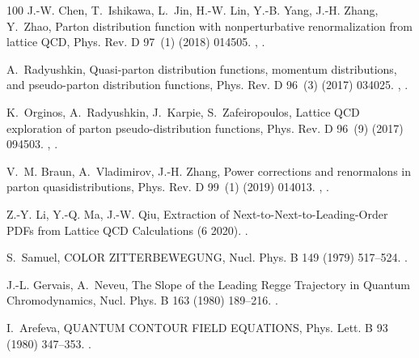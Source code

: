 \begin{thebibliography}{100}
J.-W. Chen, T.~Ishikawa, L.~Jin, H.-W. Lin, Y.-B. Yang, J.-H. Zhang, Y.~Zhao,
  {Parton distribution function with nonperturbative renormalization from
  lattice QCD}, Phys. Rev. D 97~(1) (2018) 014505.
\newblock \href {http://arxiv.org/abs/1706.01295} {},
  \href {https://doi.org/10.1103/PhysRevD.97.014505}
  {}.

A.~Radyushkin, {Quasi-parton distribution functions, momentum distributions,
  and pseudo-parton distribution functions}, Phys. Rev. D 96~(3) (2017) 034025.
\newblock \href {http://arxiv.org/abs/1705.01488} {},
  \href {https://doi.org/10.1103/PhysRevD.96.034025}
  {}.

K.~Orginos, A.~Radyushkin, J.~Karpie, S.~Zafeiropoulos, {Lattice QCD
  exploration of parton pseudo-distribution functions}, Phys. Rev. D 96~(9)
  (2017) 094503.
\newblock \href {http://arxiv.org/abs/1706.05373} {},
  \href {https://doi.org/10.1103/PhysRevD.96.094503}
  {}.

V.~M. Braun, A.~Vladimirov, J.-H. Zhang, {Power corrections and renormalons in
  parton quasidistributions}, Phys. Rev. D 99~(1) (2019) 014013.
\newblock \href {http://arxiv.org/abs/1810.00048} {},
  \href {https://doi.org/10.1103/PhysRevD.99.014013}
  {}.

Z.-Y. Li, Y.-Q. Ma, J.-W. Qiu, {Extraction of Next-to-Next-to-Leading-Order
  PDFs from Lattice QCD Calculations} (6 2020).
\newblock \href {http://arxiv.org/abs/2006.12370} {}.

S.~Samuel, {COLOR ZITTERBEWEGUNG}, Nucl. Phys. B 149 (1979) 517--524.
\newblock \href {https://doi.org/10.1016/0550-3213(79)90005-1}
  {}.

J.-L. Gervais, A.~Neveu, {The Slope of the Leading Regge Trajectory in Quantum
  Chromodynamics}, Nucl. Phys. B 163 (1980) 189--216.
\newblock \href {https://doi.org/10.1016/0550-3213(80)90397-1}
  {}.

I.~Arefeva, {QUANTUM CONTOUR FIELD EQUATIONS}, Phys. Lett. B 93 (1980)
  347--353.
\newblock \href {https://doi.org/10.1016/0370-2693(80)90529-8}
  {}.


\end{thebibliography}
